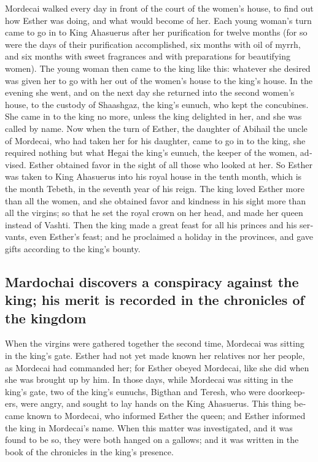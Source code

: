 \begin{paracol}{2}
\begin{otherlanguage}{english}
 Mordecai walked every day in front of the court of the
women's house, to find out how Esther was doing, and what would become
of her.  Each young woman's turn came to go in to King
Ahasuerus after her purification for twelve months (for so were the days
of their purification accomplished, six months with oil of myrrh, and
six months with sweet fragrances and with preparations for beautifying
women).  The young woman then came to the king like this:
whatever she desired was given her to go with her out of the women's
house to the king's house.  In the evening she went, and
on the next day she returned into the second women's house, to the
custody of Shaashgaz, the king's eunuch, who kept the concubines. She
came in to the king no more, unless the king delighted in her, and she
was called by name.  Now when the turn of Esther, the
daughter of Abihail the uncle of Mordecai, who had taken her for his
daughter, came to go in to the king, she required nothing but what Hegai
the king's eunuch, the keeper of the women, advised. Esther obtained
favor in the sight of all those who looked at her.  So
Esther was taken to King Ahasuerus into his royal house in the tenth
month, which is the month Tebeth, in the seventh year of his reign.
 The king loved Esther more than all the women, and she
obtained favor and kindness in his sight more than all the virgins; so
that he set the royal crown on her head, and made her queen instead of
Vashti.  Then the king made a great feast for all his
princes and his servants, even Esther's feast; and he proclaimed a
holiday in the provinces, and gave gifts according to the king's bounty.

\hypertarget{mardochai-discovers-a-conspiracy-against-the-king-his-merit-is-recorded-in-the-chronicles-of-the-kingdom}{%
\subsection{Mardochai discovers a conspiracy against the king; his merit
is recorded in the chronicles of the
kingdom}\label{mardochai-discovers-a-conspiracy-against-the-king-his-merit-is-recorded-in-the-chronicles-of-the-kingdom}}

 When the virgins were gathered together the second time,
Mordecai was sitting in the king's gate.  Esther had not
yet made known her relatives nor her people, as Mordecai had commanded
her; for Esther obeyed Mordecai, like she did when she was brought up by
him.  In those days, while Mordecai was sitting in the
king's gate, two of the king's eunuchs, Bigthan and Teresh, who were
doorkeepers, were angry, and sought to lay hands on the King Ahasuerus.
 This thing became known to Mordecai, who informed Esther
the queen; and Esther informed the king in Mordecai's name.
 When this matter was investigated, and it was found to
be so, they were both hanged on a gallows; and it was written in the
book of the chronicles in the king's presence.


\end{otherlanguage}
\end{paracol}
